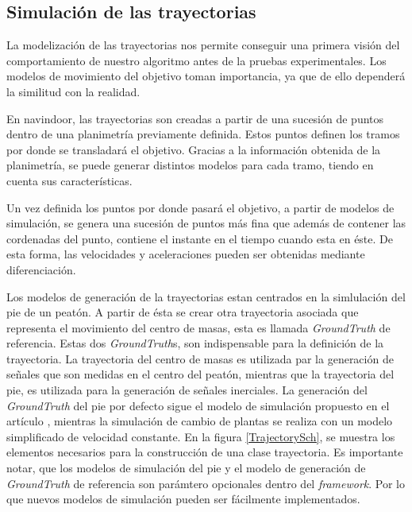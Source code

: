 


\subsection{Simulación de las trayectorias}

La modelización de las trayectorias nos permite conseguir una primera visión del comportamiento de nuestro algoritmo antes de la pruebas experimentales. Los modelos de movimiento del objetivo toman importancia, ya que de ello dependerá la similitud con la realidad.

En navindoor, las trayectorias son creadas a partir de una sucesión de puntos dentro de una planimetría previamente definida. Estos puntos definen los tramos por donde se transladará el objetivo. Gracias a la información obtenida de la planimetría, se puede generar distintos modelos para cada tramo, tiendo en cuenta sus características. 

Un vez definida los puntos por donde pasará el objetivo, a partir de modelos de simulación, se genera una sucesión de puntos más fina que además de contener las cordenadas del punto, contiene el instante en el tiempo cuando esta en éste. De esta forma, las velocidades y aceleraciones pueden ser obtenidas mediante diferenciación.

Los modelos de generación de la trayectorias estan centrados en la simlulación del pie de un peatón. A partir de ésta se crear otra trayectoria asociada que representa el movimiento del centro de masas, esta es llamada \emph{GroundTruth} de referencia. Estas dos \emph{GroundTruth}s, son indispensable para la definición de la trayectoria. La trayectoria del centro de masas es utilizada par la generación de señales que son medidas en el centro del peatón, mientras que la trayectoria del pie, es utilizada para la generación de señales inerciales. La generación del \emph{GroundTruth} del pie por defecto sigue el modelo de simulación propuesto en el artículo \cite{Zampella2011}, mientras la simulación de cambio de plantas se realiza con un modelo simplificado de velocidad constante.
En la figura \ref{TrajectorySch}, se muestra los elementos necesarios para la construcción de una clase trayectoria. Es importante notar, que los modelos de simulación del pie y el modelo de generación de \emph{GroundTruth} de referencia son parámtero opcionales dentro del \emph{framework}. Por lo que nuevos modelos de simulación pueden ser fácilmente implementados. 


